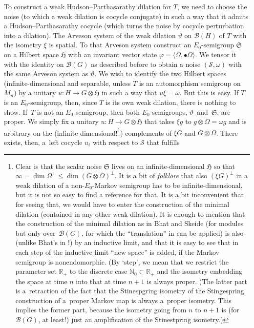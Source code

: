\documentclass[pdftex]{sigma}%
\newcommand{\eus}[1]{\mathscr{#1}}
\newcommand{\euf}[1]{\mathfrak{#1}}
\newcommand{\bb}[1]{\mathbb{#1}}
\newcommand{\vt}{\vartheta}
\newcommand{\vp}{\varphi}
\newcommand{\om}{\omega}
\newcommand{\Om}{\Omega}
\newcommand{\AB}[1]{\langle#1\rangle}
\newcommand{\N}{\bb{N}}
\newcommand{\R}{\bb{R}}
\newcommand{\sB}{\eus{B}}
\newcommand{\sS}{\eus{S}}
\newcommand{\eH}{\euf{H}}
\newcommand{\eS}{\euf{S}}
\numberwithin{equation}{section}
\begin{document}
To construct a weak Hudson--Parthasarathy dilation for $T$, we need to choose the noise (to which a weak dilation is cocycle conjugate) in such a way that it admits a Hudson--Parthasarathy cocycle (which turns the noise by cocycle perturbation into a dilation). The Arveson system of the weak dilation $\vt$ on $\sB(H)$ of $T$ with the isometry $\xi$ is spatial. To that Arveson system construct an $E_0$-semigroup $\eS$ on a Hilbert space $\eH$ with an invariant vector state $\vp=\AB{\Om,\bullet\Om}$. We tensor it with the identity on $\sB(G)$ as described before to obtain a noise $(\sS,\om)$ with the same Arveson system as $\vt$. We wish to identify the two Hilbert spaces (infinite-dimensional and separable, unless $T$ is an automorphism semigroup on $M_n$) by a unitary $u\colon H\rightarrow G\otimes\eH$ in such a way that $u\xi=\om$. But this is easy. If $T$ is an $E_0$-semigroup, then, since $T$ is its own weak dilation, there is nothing to show. If~$T$ is not an $E_0$-semigroup, then both $E_0$-semigroups, $\vt$~and~$\eS$, are proper. We simply fix a unitary $u\colon H\rightarrow G\otimes\eH$ that takes $\xi g$ to $g\otimes\Om=\om g$ and is arbitrary on the (infinite-dimensional!\footnote{Clear is that the scalar noise $\eS$ lives on an infinite-dimensional $\eH$ so that $\infty=\dim\Om^\perp\le\dim(G\otimes\Om)^\perp$. It is a bit of {\it folklore} that also $(\xi G)^\perp$ in a weak dilation of a non-$E_0$-Markov semigroup has to be infinite-dimensional, but it is not so easy to find a reference for that. It is a bit inconvenient that for seeing that, we would have to enter the construction of the minimal dilation (contained in any other weak dilation). It is enough to mention that the construction of the minimal dilation as in Bhat and Skeide \cite[Section 5]{BhSk00} (for modules but only over~$\sB(G)$, for which the ``translation'' in \cite[Section 13]{BhSk00} can be applied) is also (unlike Bhat's in \cite{Bha96}!) by an inductive limit, and that it is easy to see that in each step of the inductive limit ``new space'' is added, if the Markov semigroup is nonendomorphic. (By `step', we mean that we restrict the parameter set $\R_+$ to the discrete case $\N_0\subset\R_+$ and the isometry embedding the space at time $n$ into that at time $n+1$ is always proper. (The latter part is a~retraction of the fact that the Stinespgring isometry of the Stingespring construction of a~proper Markov map is always a~proper isometry. This implies the former part, because the isometry going from $n$ to $n+1$ is (for $\sB(G)$, at least!) just an amplification of the Stinestpring isometry.)}) complements of $\xi G$ and $G\otimes\Om$. There exists, then, a~left cocycle $u_t$ with respect to $\sS$ that fulfills
\end{document}

